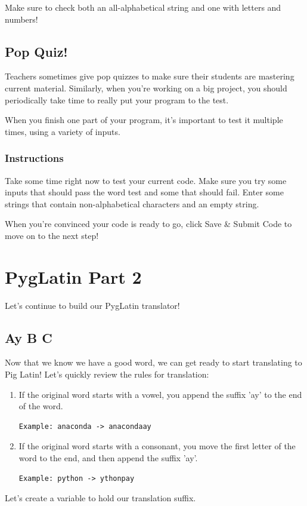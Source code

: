 \documentclass[12pt,a4paper,final,twoside,onecolumn,titlepage]{book}
\begin{document}
Make sure to check both an all-alphabetical string and one with letters and numbers!

\subsection{Pop Quiz!}

Teachers sometimes give pop quizzes to make sure their students are mastering current material. Similarly, when you're working on a big project, you should periodically take time to really put your program to the test.

When you finish one part of your program, it's important to test it multiple times, using a variety of inputs.
\subsubsection{Instructions}

Take some time right now to test your current code. Make sure you try some inputs that should pass the word test and some that should fail. Enter some strings that contain non-alphabetical characters and an empty string.

When you're convinced your code is ready to go, click Save \& Submit Code to move on to the next step!

\section{PygLatin Part 2}
Let's continue to build our PygLatin translator!

\subsection{Ay B C}

Now that we know we have a good word, we can get ready to start translating to Pig Latin! Let's quickly review the rules for translation:
\begin{enumerate}
\item If the original word starts with a vowel, you append the suffix 'ay' to the end of the word.
\begin{lstlisting}
Example: anaconda -> anacondaay
\end{lstlisting}
\item If the original word starts with a consonant, you move the first letter of the word to the end, and then append the suffix 'ay'.
\begin{lstlisting}
Example: python -> ythonpay
\end{lstlisting}
\end{enumerate}
Let's create a variable to hold our translation suffix.
\end{document}
